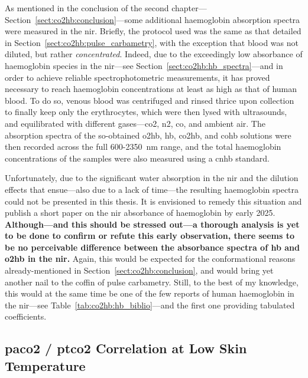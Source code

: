 As mentioned in the conclusion of the second chapter---Section~\ref{sect:co2hb:conclusion}---some additional haemoglobin absorption spectra were measured in the \gls{nir}. Briefly, the protocol used was the same as that detailed in Section~\ref{sect:co2hb:pulse_carbametry}, with the exception that blood was not diluted, but rather \emph{concentrated}. Indeed, due to the exceedingly low absorbance of haemoglobin species in the \gls{nir}---see Section~\ref{sect:co2hb:hb_spectra}---and in order to achieve reliable spectrophotometric measurements, it has proved necessary  to reach haemoglobin concentrations at least as high as that of human blood. To do so, venous blood was centrifuged and rinsed thrice upon collection to finally keep only the erythrocytes, which were then lysed with ultrasounds, and equilibrated with different gases---\gls{co2}, \gls{n2}, \gls{co}, and ambient air. The absorption spectra of the so-obtained \gls{o2hb}, \gls{hb}, \gls{co2hb}, and \gls{cohb} solutions were then recorded across the full 600-2350~nm range, and the total haemoglobin concentrations of the samples were also measured using a \gls{cnhb} standard.

Unfortunately, due to the significant water absorption in the \gls{nir} and the dilution effects that ensue---also due to a lack of time---the resulting haemoglobin spectra could not be presented in this thesis. It is envisioned to remedy this situation and publish a short paper on the \gls{nir} absorbance of haemoglobin by early 2025. \textbf{Although---and this should be stressed out---a thorough analysis is yet to be done to confirm or refute this early observation, there seems to be no perceivable difference between the absorbance spectra of \gls{hb} and \gls{o2hb} in the \gls{nir}.} Again, this would be expected for the conformational reasons already-mentioned in Section~\ref{sect:co2hb:conclusion}, and would bring yet another nail to the coffin of pulse carbametry. Still, to the best of my knowledge, this would at the same time be one of the few reports of human haemoglobin in the \gls{nir}---see Table~\ref{tab:co2hb:hb_biblio}---and the first one providing tabulated coefficients.

\subsection{\texorpdfstring{\gls{paco2} / \gls{ptco2}}{paCO2 / tcpCO2} Correlation at Low Skin Temperature}\label{sect:conclusion:paptccorrel}

